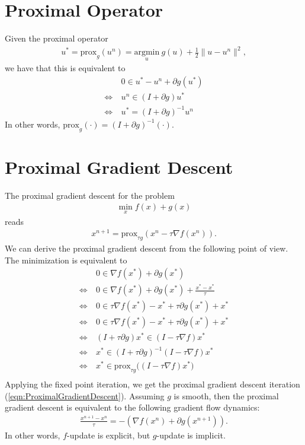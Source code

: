 \documentclass[11pt]{book}
\begin{document}
\section{Proximal Operator}

Given the proximal operator
\begin{align}
  u^* = \text{prox}_{g}(u^n) = \underset{u}{\mathrm{argmin}} \ g(u) + \frac{1}{2}\|u-u^n\|^2,
\end{align}
we have that this is equivalent to
\begin{align}
  & 0 \in u^* - u^n + \partial g(u^*) \\
  \Leftrightarrow\  & u^n \in (I + \partial g) u^* \\
  \Leftrightarrow\  & u^* = (I + \partial g)^{-1} u^n 
\end{align}
In other words, $\text{prox}_g(\cdot) = (I + \partial g)^{-1}(\cdot)$.

\section{Proximal Gradient Descent}

The proximal gradient descent for the problem
\begin{align}
  \min_x f(x) + g(x)
\end{align}
reads
\begin{align}\label{eqn:ProximalGradientDescent}
  x^{n+1} = \text{prox}_{\tau g} (x^n - \tau \nabla f(x^n)).
\end{align}
We can derive the proximal gradient descent from the following point of view. The minimization is equivalent to
\begin{align*}
  & 0 \in \nabla f(x^*) + \partial g(x^*) \\
  \Leftrightarrow\   & 0 \in \nabla f(x^*) + \partial g(x^*) + \frac{x^* - x^*}{\tau} \\
  \Leftrightarrow\   & 0 \in \tau \nabla f(x^*) -x^* +  \tau \partial g(x^*) + x^* \\
  \Leftrightarrow\   & 0 \in \tau \nabla f(x^*) -x^* +  \tau \partial g(x^*) + x^* \\
  \Leftrightarrow\   & (I + \tau \partial g)x^*  \in (I - \tau\nabla f)x^* \\
  \Leftrightarrow\   & x^*  \in (I + \tau \partial g)^{-1} (I - \tau\nabla f)x^* \\
  \Leftrightarrow\   & x^*  \in \text{prox}_{\tau g} \Big( (I - \tau\nabla f)x^* \Big)\\
\end{align*}
Applying the fixed point iteration, we get the proximal gradient descent iteration (\ref{eqn:ProximalGradientDescent}). Assuming $g$ is smooth, then the proximal gradient descent is equivalent to the following gradient flow dynamics:
\begin{align}\label{eqn:gradient_explicit_implicit}
  \frac{x^{n+1}-x^n}{\tau} = - \left(\nabla f(x^n) + \partial g(x^{n+1})\right).
\end{align}
In other words, $f$-update is explicit, but $g$-update is implicit.
\end{document}
